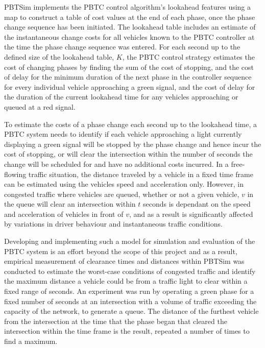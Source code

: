 PBTSim implements the PBTC control algorithm's lookahead features using a map to construct a table of cost values at the end of each phase, once the phase change sequence has been initiated. The lookahead table includes an estimate of the instantaneous change costs for all vehicles known to the PBTC controller at the time the phase change sequence was entered. For each second up to the defined size of the lookahead table, $K$, the PBTC control strategy estimates the cost of changing phases by finding the sum of the cost of stopping, and the cost of delay for the minimum duration of the next phase in the controller sequence for every individual vehicle approaching a green signal, and the cost of delay for the duration of the current lookahead time for any vehicles approaching or queued at a red signal. 

To estimate the costs of a phase change each second up to the lookahead time, a PBTC system needs to identify if each vehicle approaching a light currently displaying a green signal will be stopped by the phase change and hence incur the cost of stopping, or will clear the intersection within the number of seconds the change will be scheduled for and have no additional costs incurred. In a free-flowing traffic situation, the distance traveled by a vehicle in a fixed time frame can be estimated using the vehicles speed and acceleration only. However, in congested traffic where vehicles are queued, whether or not a given vehicle, $v$ in the queue will clear an intersection within $t$ seconds is dependant on the speed and acceleration of vehicles in front of $v$, and as a result is significantly affected by variations in driver behaviour and instantaneous traffic conditions. 

Developing and implementing such a model for simulation and evaluation of the PBTC system is an effort beyond the scope of this project and as a result, empirical measurement of clearance times and distances within PBTSim was conducted to estimate the worst-case conditions of congested traffic and identify the maximum distance a vehicle could be from a traffic light to clear within a fixed range of seconds. An experiment was run by operating a green phase for a fixed number of seconds at an intersection with a volume of traffic exceeding the capacity of the network, to generate a queue. The distance of the furthest vehicle from the intersection at the time that the phase began that cleared the intersection within the time frame is the result, repeated a number of times to find a maximum. 

